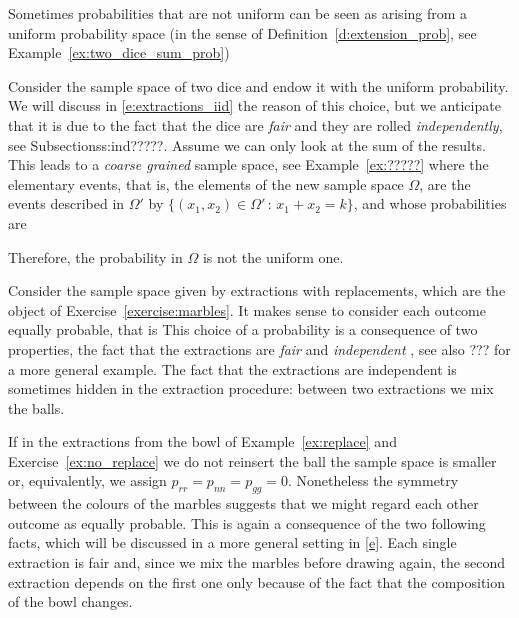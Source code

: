  Sometimes probabilities that are not uniform can be seen as arising from a uniform probability space (in the sense of Definition~\ref{d:extension_prob}, see Example~\ref{ex:two_dice_sum_prob}) 
\begin{example}
	\label{d:two_dice_sum}
	 Consider the sample space of two dice 
	and endow it with the uniform probability. We will discuss in \ref{e:extractions_iid} the reason of this choice, but we anticipate that it is due to the fact that the dice are \emph{fair} and they are rolled \emph{independently}, see Subsection{ss:ind}?????.
	Assume we can only look at the sum of the results. This leads to a \emph{coarse grained} sample space, see Example~\ref{ex:?????} where the elementary events, that is, the elements of the new sample space $\Omega$, are the events described in $\Omega'$ by  $\{(x_1,x_2)\in\Omega'\,:\,x_1+x_2=k\}$, and whose probabilities are  
\end{example}
Therefore, the probability in $\Omega$ is not the uniform one. 
\begin{example}
	\label{ex:replace}
	Consider the sample space given by extractions with replacements, which are the object of Exercise~\ref{exercise:marbles}. It makes sense to consider each outcome equally probable, that is 
	This choice of a probability is a consequence of two properties, the fact that the extractions are \emph{fair} and \emph{ independent }, see also ??? for a more general example. The fact that the extractions are independent is sometimes hidden in the extraction procedure: between two extractions we mix the balls.  
	\end{example}

	\begin{example}
	\label{ex:no_replace}
	If in the extractions from the bowl of Example~\ref{ex:replace} and Exercise~\ref{ex:no_replace} we do not reinsert the ball the sample space is smaller or, equivalently, we assign $p_{rr} = p_{nn}  = p_{gg} = 0$. Nonetheless the symmetry between the colours of the marbles suggests that we might regard each other outcome as equally probable. This is again a consequence of the two following facts, which will be discussed in a more general setting in \eqref{e}. Each single extraction is fair and, since we mix the marbles before drawing again, the second extraction depends on the first one only because of the fact that the composition of the bowl changes. 
	\end{example}


